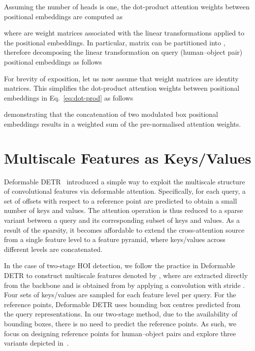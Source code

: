 \documentclass[10pt,twocolumn,letterpaper]{article}
\begin{document}
Assuming the number of heads is one, the dot-product attention weights between positional embeddings are computed as

where  are weight matrices associated with the linear transformations applied to the positional embeddings. In particular, matrix  can be partitioned into , therefore decomposing the linear transformation on query (human--object pair) positional embeddings as follows

For brevity of exposition, let us now assume that weight matrices  are identity matrices. This simplifies the dot-product attention weights between positional embeddings in Eq.~\ref{eq:dot-prod} as follows

demonstrating that the concatenation of two modulated box positional embeddings results in a weighted sum of the pre-normalised attention weights.

\section{Multiscale Features as Keys/Values}

Deformable DETR~\cite{deform-detr} introduced a simple way to exploit the multiscale structure of convolutional features via deformable attention. Specifically, for each query, a set of offsets with respect to a reference point are predicted to obtain a small number of keys and values. The attention operation is thus reduced to a sparse variant between a query and its corresponding subset of keys and values. As a result of the sparsity, it becomes affordable to extend the cross-attention source from a single feature level to a feature pyramid, where keys/values across different levels are concatenated.

In the case of two-stage HOI detection, we follow the practice in Deformable DETR to construct multiscale features denoted by , where  are extracted directly from the backbone and  is obtained from  by applying a  convolution with stride . Four sets of keys/values are sampled for each feature level per query. For the reference points, Deformable DETR uses bounding box centres predicted from the query representations. In our two-stage method, due to the availability of bounding boxes, there is no need to predict the reference points. As such, we focus on designing reference points for human--object pairs and explore three variants depicted in~.
\end{document}
